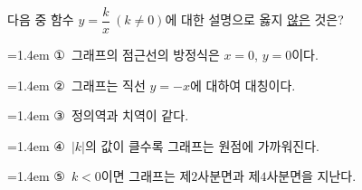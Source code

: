 \hspace*{2mm}\begin{minipage}[t]{\dimexpr\linewidth-2mm\relax}\vspace{0pt}
다음 중 함수 $y=\dfrac{k}{x}\ (k\ne 0)$에 대한 설명으로 옳지 \underline{않은} 것은?
\par\medskip\par\noindent\hangindent=1.4em {\small ①}\ 그래프의 점근선의 방정식은 $x=0$, $y=0$이다.\par\noindent\hangindent=1.4em {\small ②}\ 그래프는 직선 $y=-x$에 대하여 대칭이다.\par\noindent\hangindent=1.4em {\small ③}\ 정의역과 치역이 같다.\par\noindent\hangindent=1.4em {\small ④}\ $|k|$의 값이 클수록 그래프는 원점에 가까워진다.\par\noindent\hangindent=1.4em {\small ⑤}\ $k<0$이면 그래프는 제$2$사분면과 제$4$사분면을 지난다.\par\medskip\end{minipage}
